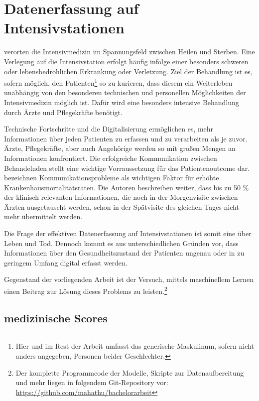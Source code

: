 \section{Datenerfassung auf Intensivstationen}
\cite{marxIntensivmedizin2015c} verorten die Intensivmedizin im Spannungsfeld zwischen Heilen und Sterben. Eine Verlegung auf die Intensivstation erfolgt häufig infolge einer besonders schweren oder lebensbedrohlichen Erkrankung oder Verletzung. 
Ziel der Behandlung ist es, sofern möglich, den Patienten\footnote{Hier und im Rest der Arbeit umfasst das generische Maskulinum, sofern nicht anders angegeben, Personen beider Geschlechter.} so zu kurieren, dass diesem ein Weiterleben unabhängig von den besonderen technischen und personellen Möglichkeiten der Intensivmedizin möglich ist. Dafür wird eine besonders intensive Behandlung durch Ärzte und Pflegekräfte benötigt.

Technische Fortschritte und die Digitalisierung ermöglichen es, mehr Informationen über jeden Patienten zu erfassen und zu verarbeiten als je zuvor. Ärzte, Pflegekräfte, aber auch Angehörige werden so mit großen Mengen an Informationen konfrontiert. Die erfolgreiche Kommunikation zwischen Behandelnden stellt eine wichtige Vorraussetzung für das Patientenoutcome dar. \cite{marxIntensivmedizin2015c} bezeichnen Kommunikationsprobleme als wichtigen Faktor für erhöhte Krankenhausmortalitätsraten. Die Autoren beschreiben weiter, dass bis zu 50 \% der klinisch relevanten Informationen, die noch in der Morgenvisite zwischen Ärzten ausgetauscht werden, schon in der Spätvisite des gleichen Tages nicht mehr übermittelt werden. %

Die Frage der effektiven Datenerfassung auf Intensivstationen ist somit eine über Leben und Tod. Dennoch kommt es aus unterschiedlichen Gründen vor, dass Informationen über den Gesundheitszustand der Patienten ungenau oder in zu geringem Umfang digital erfasst werden. 

Gegenstand der vorliegenden Arbeit ist der Versuch, mittels maschinellem Lernen einen Beitrag zur Lösung dieses Problems zu leisten.\footnote{Der komplette Programmcode der Modelle, Skripte zur Datenaufbereitung und mehr liegen in folgendem Git-Repository vor: \url{https://github.com/mahathu/bachelorarbeit}}

\subsection{medizinische Scores} \label{section:scores}

